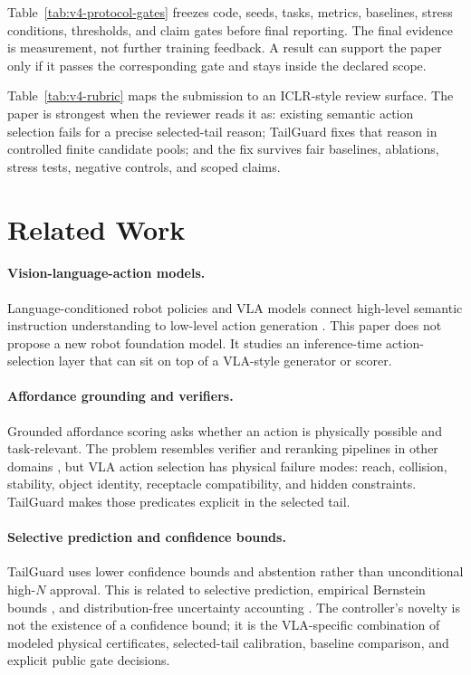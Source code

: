 \documentclass{article}
\begin{document}


Table~\ref{tab:v4-protocol-gates} freezes code, seeds, tasks, metrics, baselines, stress conditions, thresholds, and claim gates before final reporting. The final evidence is measurement, not further training feedback. A result can support the paper only if it passes the corresponding gate and stays inside the declared scope.



Table~\ref{tab:v4-rubric} maps the submission to an ICLR-style review surface. The paper is strongest when the reviewer reads it as: existing semantic action selection fails for a precise selected-tail reason; TailGuard fixes that reason in controlled finite candidate pools; and the fix survives fair baselines, ablations, stress tests, negative controls, and scoped claims.

\section{Related Work}

\paragraph{Vision-language-action models.}
Language-conditioned robot policies and VLA models connect high-level semantic instruction understanding to low-level action generation \citep{ahn2022saycan,brohan2022rt1,brohan2023rt2,kim2024openvla}. This paper does not propose a new robot foundation model. It studies an inference-time action-selection layer that can sit on top of a VLA-style generator or scorer.

\paragraph{Affordance grounding and verifiers.}
Grounded affordance scoring asks whether an action is physically possible and task-relevant. The problem resembles verifier and reranking pipelines in other domains \citep{cobbe2021verifiers,stiennon2020summarize}, but VLA action selection has physical failure modes: reach, collision, stability, object identity, receptacle compatibility, and hidden constraints. TailGuard makes those predicates explicit in the selected tail.

\paragraph{Selective prediction and confidence bounds.}
TailGuard uses lower confidence bounds and abstention rather than unconditional high-$N$ approval. This is related to selective prediction, empirical Bernstein bounds \citep{maurer2009empirical}, and distribution-free uncertainty accounting \citep{vovk2005algorithmic}. The controller's novelty is not the existence of a confidence bound; it is the VLA-specific combination of modeled physical certificates, selected-tail calibration, baseline comparison, and explicit public gate decisions.
\end{document}
